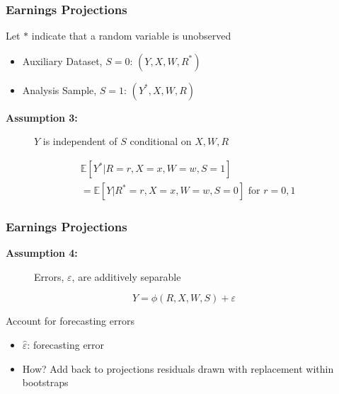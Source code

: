 \documentclass[static]{JJH-Beamer}
\begin{document}
\begin{frame}
\frametitle{Earnings Projections}
Let $*$ indicate that a random variable is unobserved
\begin{itemize}
	\item Auxiliary Dataset, $S = 0$:  $\left( Y, X, W, R^{*} \right)$
	\item Analysis Sample, $S = 1$:   $\left( Y^{*}, X, W, R \right)$
\end{itemize}
\begin{description}
	\item [\textbf{Assumption 3:}] $Y$ is independent of $S$ conditional on $X, W, R$
\end{description}
\begin{align*}
	&\mathbb{E} \left[ Y^{*} | R = r, X = x, W = w, S = 1 \right] \\
	&= \mathbb{E} \left[ Y | R^{*} = r, X = x, W = w, S = 0 \right] \text{ for } r = 0,1
\end{align*}
\end{frame}


\begin{frame}
\frametitle{Earnings Projections}
\begin{description}
	\item [\textbf{Assumption 4:}] Errors, $\varepsilon$, are additively separable
\end{description}

\begin{equation}
	Y = \phi \left( R, X, W, S \right) + \varepsilon
\end{equation}

Account for forecasting errors
\begin{itemize}
	\item $\widehat{\varepsilon}$: forecasting error  
	\item How? Add back to projections residuals drawn with replacement within bootstraps
\end{itemize}
\end{frame}

\end{document}

